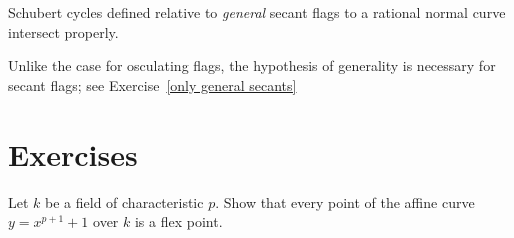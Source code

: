 \begin{corollary}\label{secant schubert proper}
Schubert cycles defined relative to \emph{general} secant flags to a rational normal curve intersect properly.
\end{corollary} 

Unlike the case for osculating flags, the hypothesis of generality is necessary for secant flags; see Exercise~\ref{only general secants}



\section{Exercises}
\begin{exercise}\label{inseparable Gauss}
Let $k$ be a field of characteristic $p$. Show that every point of the affine curve $y = x^{p+1}+1$ over $k$ is a flex point.
 
\end{exercise}

